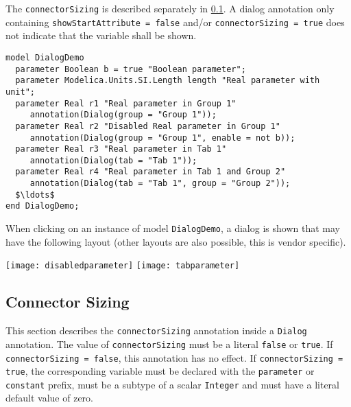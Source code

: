 \begin{annotationdefinition}[Dialog]
\begin{semantics}
The \lstinline!connectorSizing! is described separately in \cref{connector-sizing}.
A dialog annotation only containing \lstinline!showStartAttribute = false! and/or \lstinline!connectorSizing = true! does not indicate that the variable shall be shown.

\begin{example}
\begin{lstlisting}[language=modelica]
model DialogDemo
  parameter Boolean b = true "Boolean parameter";
  parameter Modelica.Units.SI.Length length "Real parameter with unit";
  parameter Real r1 "Real parameter in Group 1"
     annotation(Dialog(group = "Group 1"));
  parameter Real r2 "Disabled Real parameter in Group 1"
     annotation(Dialog(group = "Group 1", enable = not b));
  parameter Real r3 "Real parameter in Tab 1"
     annotation(Dialog(tab = "Tab 1"));
  parameter Real r4 "Real parameter in Tab 1 and Group 2"
     annotation(Dialog(tab = "Tab 1", group = "Group 2"));
  $\ldots$
end DialogDemo;
\end{lstlisting}
When clicking on an instance of model \lstinline!DialogDemo!, a dialog is shown that may have the following layout (other layouts are also possible, this is vendor specific).

\begin{center}
\texttt{[image: disabledparameter]}
\quad
\texttt{[image: tabparameter]}\\
\end{center}
\end{example}
\end{semantics}
\end{annotationdefinition}

\subsection{Connector Sizing}\label{connector-sizing}

This section describes the \lstinline!connectorSizing! annotation inside a \lstinline!Dialog! annotation.
The value of \lstinline!connectorSizing! must be a literal \lstinline!false! or \lstinline!true!.
If \lstinline!connectorSizing = false!, this annotation has no effect.
If \lstinline!connectorSizing = true!, the corresponding variable must be declared with the \lstinline!parameter! or \lstinline!constant! prefix, must be a subtype of a scalar \lstinline!Integer! and must have a literal default value of zero.

